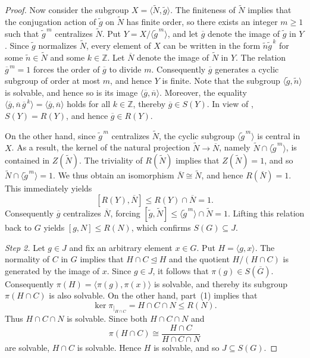 \documentclass[11pt, reqno]{amsart}
\numberwithin{equation}{section}
\theoremstyle{definition}
\numberwithin{equation}{section}
\begin{document}
\begin{proof}
Now consider the subgroup $X=\langle \widetilde{N},\widetilde{g}\rangle.$ The finiteness of $\widetilde{N}$ implies that the conjugation action of $\widetilde{g}$ on $ \widetilde{N}$ has finite order, so there exists an integer $m \geq 1$ such that $\widetilde{g}^{\,m} $ centralizes $\widetilde{N}$. Put $Y = X / \langle \widetilde{g}^{\,m} \rangle$, and let $ \overline{g}$ denote the image of $ \widetilde{g}$ in $Y$. Since $\widetilde{g}$ normalizes $ \widetilde{N}$, every element of $X$ can be written in the form $\widetilde{n}\widetilde{g}^{\,k}$ for some $ \widetilde{n} \in \widetilde{N}$ and some $k \in \mathbb{Z}$. Let $\overline{N}$ denote the image of $\widetilde{N}$ in $Y$. The relation $\overline{g}^{\,m} = 1$ forces the order of $\overline{g}$ to divide $m$. Consequently $ \overline{g}$ generates a cyclic subgroup of order at most $m$, and hence $Y$ is finite. Note that the subgroup $\langle\widetilde{g},\widetilde{n}\rangle$ is solvable, and hence so is its image $\langle\overline{g},\overline{n}\rangle$. Moreover, the equality $\langle \overline{g}, \overline{n}\,\overline{g}^{\,k} \rangle = \langle \overline{g}, \overline{n} \rangle$ holds for all $k \in \mathbb{Z}$, thereby $\overline{g}\in S(Y)$. In view of \cite[Theorem~1.1]{Guralnick06},  $S(Y) = R(Y)$, and hence $\overline{g} \in R(Y)$. 

On the other hand, since $\widetilde{g}^{\,m}$ centralizes $\widetilde{N}$, the cyclic subgroup $ \langle \widetilde{g}^{\,m} \rangle $ is central in $X$. As a result, the kernel of the natural projection $\widetilde{N} \to \overline{N}$, namely $ \widetilde{N} \cap \langle \widetilde{g}^{\,m} \rangle $, is contained in $Z(\widetilde{N})$. The triviality of $ R(\widetilde{N})$ implies that $Z(\widetilde{N}) = 1$, and so $\widetilde{N} \cap \langle \widetilde{g}^{\,m} \rangle=1$. We thus obtain an isomorphism $\overline{N} \cong \widetilde{N}$, and hence $ R(\overline{N}) = 1$. This immediately yields
$$[R(Y), \overline{N}] \leq R(Y) \cap \overline{N} = 1.$$
Consequently $\overline{g}$ centralizes $\overline{N}$, forcing $[\widetilde{g}, \widetilde{N}] \leq \langle \widetilde{g}^{\,m} \rangle \cap \widetilde{N} = 1$. Lifting this relation back to $G$ yields $[g,N] \leq R(N)$, which confirms $S(G) \subseteq J$.

\smallskip
\emph{Step 2.}
Let $g \in J $ and fix an arbitrary element $x \in G$. 
Put $H=\langle g,x\rangle$.
The normality of $C$ in $G$ implies that $H \cap C \trianglelefteq H$ and the quotient $H/(H \cap C)$ is generated by the image of $x$. 
Since $ g \in J$, it follows that $\pi(g) \in  S(\overline{G})$.
Consequently $\pi(H) = \langle \pi(g), \pi(x) \rangle$ is solvable, and thereby its subgroup $\pi(H \cap C)$ is also solvable.
On the other hand,  part~\textup{(1)} implies that $$\ker\pi_{|_{H \cap C}} = H \cap C \cap N \leq R(N).$$
Thus $H \cap C \cap N$ is solvable. 
Since both $H\cap C\cap N$ and $$\pi(H\cap C) \cong \frac{H\cap C}{H\cap C\cap N}$$
are solvable, $H\cap C$ is solvable.  Hence $H$ is solvable, and so $J\subseteq S(G).$


\end{proof}
\end{document}
